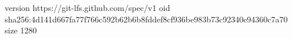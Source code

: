 version https://git-lfs.github.com/spec/v1
oid sha256:4d141d667fa77f766c592b62b6b8fddef8cf936be983b73c92340e94360c7a70
size 1280
